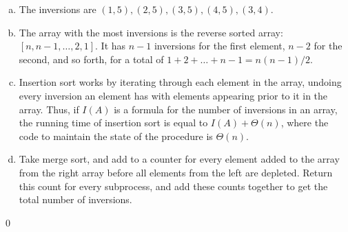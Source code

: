 \sol \begin{enumerate}[(a)]
    \item The inversions are $(1, 5), (2, 5), (3, 5), (4, 5), (3, 4)$.
    \item The array with the most inversions is the reverse sorted array: $[n, n-1, \dots, 2, 1]$. It has $n-1$ inversions for the first element, $n-2$ for the second, and so forth, for a total of $1 + 2 + \dots + n-1 = n(n-1)/2$.
    \item Insertion sort works by iterating through each element in the array, undoing every inversion an element has with elements appearing prior to it in the array. Thus, if $I(A)$ is a formula for the number of inversions in an array, the running time of insertion sort is equal to $I(A) + \Theta(n)$, where the code to maintain the state of the procedure is $\Theta(n)$.
    \item Take merge sort, and add to a counter for every element added to the array from the right array before all elements from the left are depleted. Return this count for every subprocess, and add these counts together to get the total number of inversions.
\end{enumerate}\qed